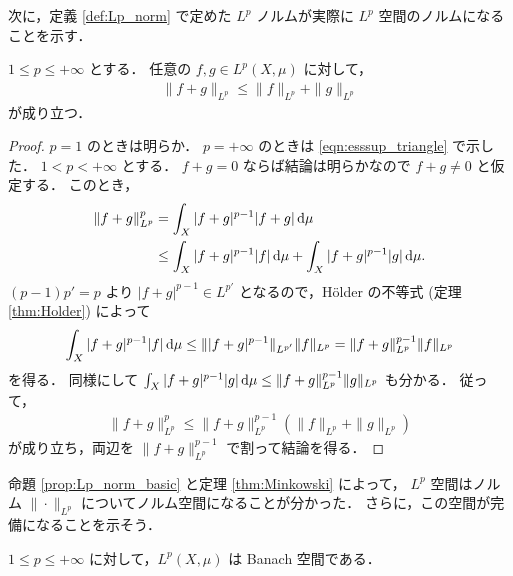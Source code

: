 次に，定義 \ref{def:Lp_norm} で定めた $L^p$ ノルムが実際に $L^p$ 空間のノルムになることを示す．

\begin{theorem}\label{thm:Minkowski}
    $1\le p\le+\infty$ とする．
    任意の $f,g\in L^p(X,\mu)$ に対して，
    \begin{align*}
        \|f+g\|_{L^p}\le\|f\|_{L^p}+\|g\|_{L^p}
    \end{align*}
    が成り立つ．
\end{theorem}

\begin{proof}
    $p=1$ のときは明らか．
    $p=+\infty$ のときは \eqref{eqn:esssup_triangle} で示した．
    $1<p<+\infty$ とする．
    $f+g=0$ ならば結論は明らかなので $f+g\ne0$ と仮定する．
    このとき，
    \begin{align*}
        \|f+g\|_{L^p}^p
        &=\int_X|f+g|^{p-1}|f+g|\,\mathrm{d}\mu\\
        &\le\int_X|f+g|^{p-1}|f|\,\mathrm{d}\mu+\int_X|f+g|^{p-1}|g|\,\mathrm{d}\mu.
    \end{align*}
    $(p-1)p'=p$ より $|f+g|^{p-1}\in L^{p'}$ となるので，H\"older の不等式 (定理 \ref{thm:Holder}) によって
    \begin{align*}
        \int_X|f+g|^{p-1}|f|\,\mathrm{d}\mu
        \le\||f+g|^{p-1}\|_{L^{p'}}\|f\|_{L^p}
        =\|f+g\|_{L^p}^{p-1}\|f\|_{L^p}
    \end{align*}
    を得る．
    同様にして $\int_X|f+g|^{p-1}|g|\,\mathrm{d}\mu\le\|f+g\|_{L^p}^{p-1}\|g\|_{L^p}$ も分かる．
    従って，
    \begin{align*}
        \|f+g\|_{L^p}^p
        \le\|f+g\|_{L^p}^{p-1}(\|f\|_{L^p}+\|g\|_{L^p})
    \end{align*}
    が成り立ち，両辺を $\|f+g\|_{L^p}^{p-1}$ で割って結論を得る．
\end{proof}

命題 \ref{prop:Lp_norm_basic} と定理 \ref{thm:Minkowski} によって，
$L^p$ 空間はノルム $\|\cdot\|_{L^p}$ についてノルム空間になることが分かった．
さらに，この空間が完備になることを示そう．

\begin{theorem}\label{thm:Riesz-Fischer}
    $1\le p\le+\infty$ に対して，$L^p(X,\mu)$ は Banach 空間である．
\end{theorem}

